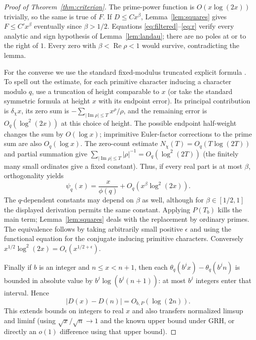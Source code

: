 \documentclass[11pt]{article}
\theoremstyle{definition}\newtheorem{definition}[theorem]{Definition}
\newcommand{\Rea}{\operatorname{Re}}
\newcommand{\Imb}{\operatorname{Im}}
\newcommand{\thq}{\theta_q}
\newcommand{\psq}{\psi_q}
\begin{document}
\begin{proof}[Proof of Theorem~\ref{thm:criterion}]
The prime-power function is $O(x\log(2x))$ trivially, so the same is true of $F$. If $D\le Cx^\beta$, Lemma~\ref{lem:squares} gives $F\le C'x^\beta$ eventually since $\beta>1/2$. Equations \eqref{eq:filtered}--\eqref{eq:r} verify every analytic and sign hypothesis of Lemma~\ref{lem:landau}; there are no poles at or to the right of $1$. Every zero with $\beta<\Rea\rho<1$ would survive, contradicting the lemma.

For the converse we use the standard fixed-modulus truncated explicit formula \cite{davenport,mv,rs}. To spell out the estimate, for each primitive character inducing a character modulo $q$, use a truncation of height comparable to $x$ (or take the standard symmetric formula at height $x$ with its endpoint error). Its principal contribution is $\delta_\chi x$, its zero sum is $-\sum_{|\Imb\rho|\le T}x^\rho/\rho$, and the remaining error is $O_q(\log^2(2x))$ at this choice of height. The possible endpoint half-weight changes the sum by $O(\log x)$; imprimitive Euler-factor corrections to the prime sum are also $O_q(\log x)$. The zero-count estimate $N_\chi(T)=O_q(T\log(2T))$ and partial summation give $\sum_{|\Imb\rho|\le T}|\rho|^{-1}=O_q(\log^2(2T))$ (the finitely many small ordinates give a fixed constant). Thus, if every real part is at most $\beta$, orthogonality yields
\[
 \psq(x)=\frac{x}{\phi(q)}+O_q(x^\beta\log^2(2x)).
\]
The $q$-dependent constants may depend on $\beta$ as well, although for $\beta\in[1/2,1]$ the displayed derivation permits the same constant. Applying $P(T_b)$ kills the main term; Lemma~\ref{lem:squares} deals with the replacement by ordinary primes. The equivalence follows by taking arbitrarily small positive $\epsilon$ and using the functional equation for the conjugate inducing primitive characters. Conversely $x^{1/2}\log^2(2x)=O_\epsilon(x^{1/2+\epsilon})$.

Finally if $b$ is an integer and $n\le x<n+1$, then each $\thq(b^jx)-\thq(b^jn)$ is bounded in absolute value by $b^j\log(b^j(n+1))$: at most $b^j$ integers enter that interval. Hence
\begin{equation}\label{eq:integer}
 |D(x)-D(n)|=O_{b,P}(\log(2n)).
\end{equation}
This extends bounds on integers to real $x$ and also transfers normalized limsup and liminf (using $\sqrt{x}/\sqrt n\to1$ and the known upper bound under GRH, or directly an $o(1)$ difference using that upper bound).
\end{proof}
\end{document}

